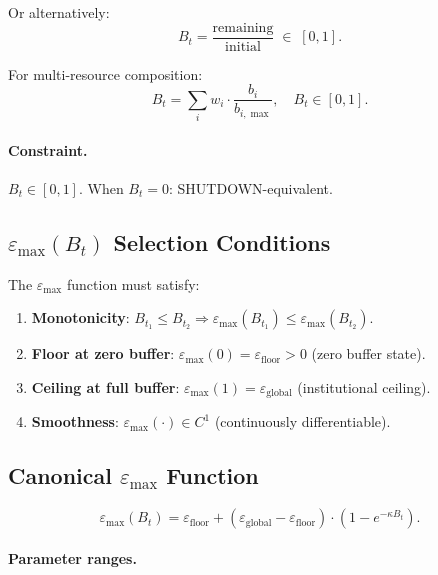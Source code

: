 \noindent
Or alternatively:
\begin{equation}
B_t = \frac{\mathrm{remaining}}{\mathrm{initial}}
\;\in\; [0, 1].
\end{equation}

\noindent
For multi-resource composition:
\begin{equation}
B_t = \sum_i w_i \cdot \frac{b_i}{b_{i, \max}},
\quad B_t \in [0, 1].
\end{equation}

\paragraph{Constraint.}
$B_t \in [0, 1]$. When $B_t = 0$: SHUTDOWN-equivalent.

\subsection{$\varepsilon_{\max}(B_t)$ Selection Conditions}

The $\varepsilon_{\max}$ function must satisfy:

\begin{enumerate}
\item \textbf{Monotonicity}: $B_{t_1} \le B_{t_2} \Rightarrow
\varepsilon_{\max}(B_{t_1}) \le \varepsilon_{\max}(B_{t_2})$.
\item \textbf{Floor at zero buffer}:
$\varepsilon_{\max}(0) = \varepsilon_{\mathrm{floor}} > 0$ (zero
buffer state).
\item \textbf{Ceiling at full buffer}:
$\varepsilon_{\max}(1) = \varepsilon_{\mathrm{global}}$
(institutional ceiling).
\item \textbf{Smoothness}: $\varepsilon_{\max}(\cdot) \in C^1$
(continuously differentiable).
\end{enumerate}

\subsection{Canonical $\varepsilon_{\max}$ Function}

\begin{equation}
\boxed{
\varepsilon_{\max}(B_t) =
\varepsilon_{\mathrm{floor}}
+ (\varepsilon_{\mathrm{global}} - \varepsilon_{\mathrm{floor}})
\cdot (1 - e^{-\kappa B_t}).
}
\label{eq:r1fix-epsilon-max-canonical}
\end{equation}

\paragraph{Parameter ranges.}

